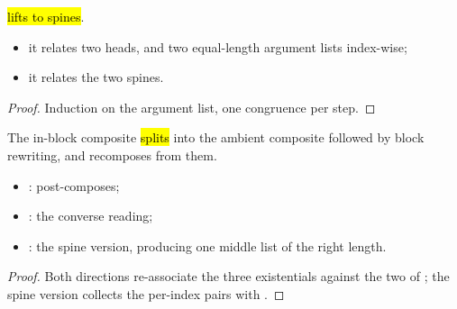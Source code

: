 \begin{lemma}
\label{lem:ConstToFVar-mkApps}
\leanok
{}
  \hl{lifts to spines}.
\begin{itemize}
\item {} it relates two heads, and two equal-length argument lists index-wise;
\item {} it relates the two spines.
\end{itemize}
\end{lemma}
\begin{proof}
\leanok
{}
 Induction on the argument list, one  congruence per step.
\end{proof}

\begin{lemma}
\label{lem:ErasesLBFix-of_erasesLB}
\leanok
{}
 The in-block composite \hl{splits} into the ambient composite followed by block
rewriting, and recomposes from them.
\begin{itemize}
\item {}: post-composes;
\item {}: the converse reading;
\item {}: the spine version, producing one middle list of the right length.
\end{itemize}
\end{lemma}
\begin{proof}
\leanok
{}
 Both directions re-associate the three existentials against the two of ; the
spine version collects the per-index pairs with .
\end{proof}

